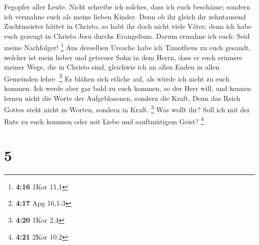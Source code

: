 Fegopfer aller Leute.  Nicht schreibe ich solches, dass
ich euch beschäme; sondern ich vermahne euch als meine lieben Kinder.
 Denn ob ihr gleich ihr zehntausend Zuchtmeister hättet
in Christo, so habt ihr doch nicht viele Väter; denn ich habe euch
gezeugt in Christo Jesu durchs Evangelium.  Darum ermahne
ich euch: Seid meine Nachfolger! \footnote{\textbf{4:16} 1Kor 11,1}
 Aus derselben Ursache habe ich Timotheus zu euch
gesandt, welcher ist mein lieber und getreuer Sohn in dem Herrn, dass er
euch erinnere meiner Wege, die in Christo sind, gleichwie ich an allen
Enden in allen Gemeinden lehre. \footnote{\textbf{4:17} Apg 16,1-3}
 Es blähen sich etliche auf, als würde ich nicht zu euch
kommen.  Ich werde aber gar bald zu euch kommen, so der
Herr will, und kennen lernen nicht die Worte der Aufgeblasenen, sondern
die Kraft.  Denn das Reich Gottes steht nicht in Worten,
sondern in Kraft. \footnote{\textbf{4:20} 1Kor 2,4}  Was
wollt ihr? Soll ich mit der Rute zu euch kommen oder mit Liebe und
sanftmütigem Geist? \footnote{\textbf{4:21} 2Kor 10,2}

\hypertarget{section-4}{%
\section{5}\label{section-4}}


